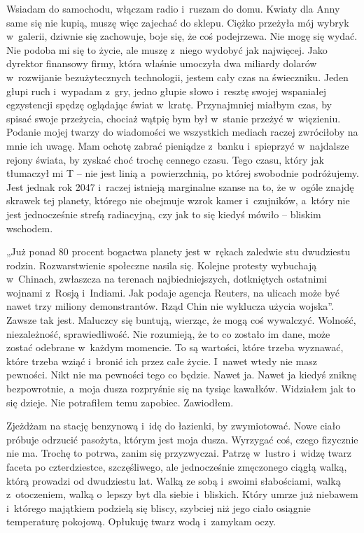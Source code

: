 Wsiadam do samochodu, włączam radio i~ruszam do domu. Kwiaty dla Anny same się nie kupią, muszę więc zajechać do sklepu. Ciężko przeżyła mój wybryk w~galerii, dziwnie się zachowuje, boje się, że coś podejrzewa. Nie mogę się wydać. Nie podoba mi się to życie, ale muszę z~niego wydobyć jak najwięcej. Jako dyrektor finansowy firmy, która właśnie umoczyła dwa miliardy dolarów w~rozwijanie bezużytecznych technologii, jestem cały czas na świeczniku. Jeden głupi ruch i~wypadam z~gry, jedno głupie słowo i~resztę swojej wspaniałej egzystencji spędzę oglądając świat w~kratę. Przynajmniej miałbym czas, by spisać swoje przeżycia, chociaż wątpię bym był w~stanie przeżyć w~więzieniu. Podanie mojej twarzy do wiadomości we wszystkich mediach raczej zwróciłoby na mnie ich uwagę. Mam ochotę zabrać pieniądze z~banku i~spieprzyć w~najdalsze rejony świata, by zyskać choć trochę cennego czasu. Tego czasu, który jak tłumaczył mi T -- nie jest linią a~powierzchnią, po której swobodnie podróżujemy. Jest jednak rok 2047 i~raczej istnieją marginalne szanse na to, że w~ogóle znajdę skrawek tej planety, którego nie obejmuje wzrok kamer i~czujników, a~który nie jest jednocześnie strefą radiacyjną, czy jak to się kiedyś mówiło -- bliskim wschodem.

„Już ponad 80 procent bogactwa planety jest w~rękach zaledwie stu dwudziestu rodzin. Rozwarstwienie społeczne nasila się. Kolejne protesty wybuchają w~Chinach, zwłaszcza na terenach najbiedniejszych, dotkniętych ostatnimi wojnami z~Rosją i~Indiami. Jak podaje agencja Reuters, na ulicach może być nawet trzy miliony demonstrantów. Rząd Chin nie wyklucza użycia wojska”. Zawsze tak jest. Maluczcy się buntują, wierząc, że mogą coś wywalczyć. Wolność, niezależność, sprawiedliwość. Nie rozumieją, że to co zostało im dane, może zostać odebrane w~każdym momencie. To są wartości, które trzeba wyznawać, które trzeba wziąć i~bronić ich przez całe życie. I~nawet wtedy nie masz pewności. Nikt nie ma pewności tego co będzie. Nawet ja. Nawet ja kiedyś zniknę bezpowrotnie, a~moja dusza rozpryśnie się na tysiąc kawałków. Widziałem jak to się dzieje. Nie potrafiłem temu zapobiec. Zawiodłem.

Zjeżdżam na stację benzynową i~idę do łazienki, by zwymiotować. Nowe ciało próbuje odrzucić pasożyta, którym jest moja dusza. Wyrzygać coś, czego fizycznie nie ma. Trochę to potrwa, zanim się przyzwyczai. Patrzę w~lustro i~widzę twarz faceta po czterdziestce, szczęśliwego, ale jednocześnie zmęczonego ciągłą walką, którą prowadzi od dwudziestu lat. Walką ze sobą i~swoimi słabościami, walką z~otoczeniem, walką o~lepszy byt dla siebie i~bliskich. Który umrze już niebawem i~którego majątkiem podzielą się bliscy, szybciej niż jego ciało osiągnie temperaturę pokojową. Opłukuję twarz wodą i~zamykam oczy.

